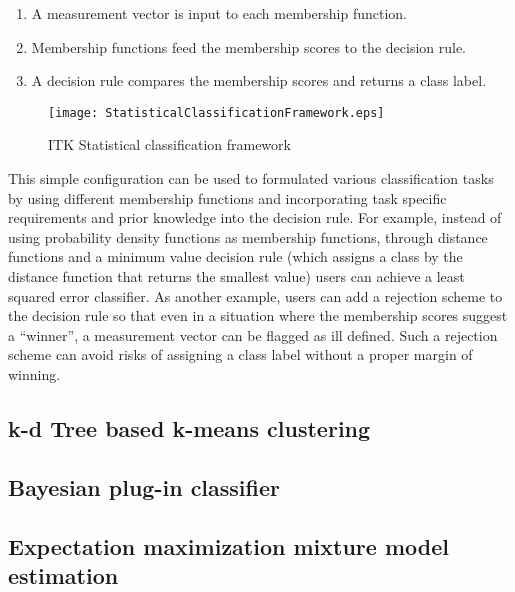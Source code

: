 \begin{enumerate}
\item{A measurement vector is input to each membership function.}
\item{Membership functions feed the membership scores to the
    decision rule.}
\item{A decision rule compares the membership scores and returns a
    class label.}
\end{enumerate}

\begin{figure}
  \centering
  \texttt{[image: StatisticalClassificationFramework.eps]}
  \caption{ITK Statistical classification framework}
  \protect\label{fig:StatisticalClassificationFramework}
\end{figure}

This simple configuration can be used to formulated various
classification tasks by using different membership functions and
incorporating task specific requirements and prior knowledge into
the decision rule. For example, instead of using probability density
functions as membership functions, through distance functions and a
minimum value decision rule (which assigns a class by the distance
function that returns the smallest value) users can achieve a least
squared error classifier. As another example, users can add a
rejection scheme to the decision rule so that even in a situation
where the membership scores suggest a ``winner'', a measurement
vector can be flagged as ill defined. Such a rejection scheme can
avoid risks of assigning a class label without a proper margin of
winning.

\subsection{k-d Tree based k-means clustering}
\label{sec:KdTreeBasedKMeansClustering}



\subsection{Bayesian plug-in classifier}
\label{sec:BayesianPluginClassifier}



\subsection{Expectation maximization mixture model estimation}
\label{sec:ExpectationMaximizationMixtureModelEstimation}





